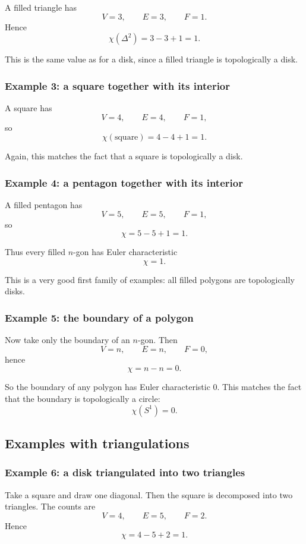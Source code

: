 \documentclass[12pt,a4paper]{article}
\theoremstyle{notespace}
\begin{document}
A filled triangle has
\[
V=3,\qquad E=3,\qquad F=1.
\]
Hence
\[
\chi(\Delta^2)=3-3+1=1.
\]

This is the same value as for a disk, since a filled triangle is topologically a disk.

\subsubsection*{Example 3: a square together with its interior}

A square has
\[
V=4,\qquad E=4,\qquad F=1,
\]
so
\[
\chi(\text{square})=4-4+1=1.
\]

Again, this matches the fact that a square is topologically a disk.

\subsubsection*{Example 4: a pentagon together with its interior}

A filled pentagon has
\[
V=5,\qquad E=5,\qquad F=1,
\]
so
\[
\chi=5-5+1=1.
\]

Thus every filled \(n\)-gon has Euler characteristic
\[
\chi=1.
\]

This is a very good first family of examples: all filled polygons are topologically disks.

\subsubsection*{Example 5: the boundary of a polygon}

Now take only the boundary of an \(n\)-gon. Then
\[
V=n,\qquad E=n,\qquad F=0,
\]
hence
\[
\chi=n-n=0.
\]

So the boundary of any polygon has Euler characteristic \(0\). This matches the fact that the boundary is topologically a circle:
\[
\chi(S^1)=0.
\]

\subsection{Examples with triangulations}

\subsubsection*{Example 6: a disk triangulated into two triangles}

Take a square and draw one diagonal. Then the square is decomposed into two triangles. The counts are
\[
V=4,\qquad E=5,\qquad F=2.
\]
Hence
\[
\chi=4-5+2=1.
\]
\end{document}
